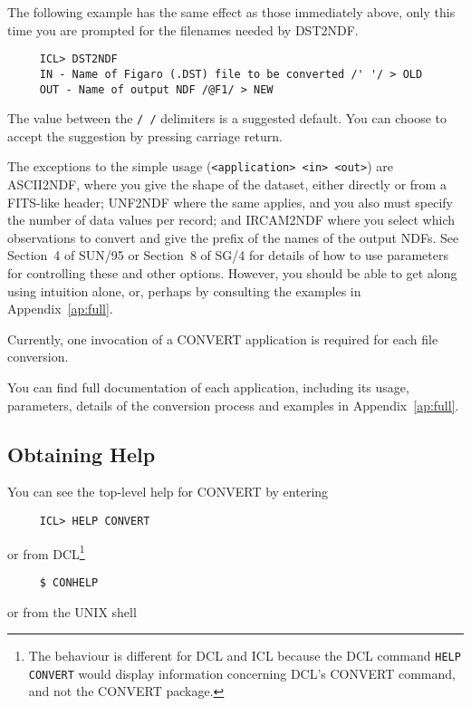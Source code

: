 The following example has the same effect as those immediately above,
only this time you are prompted for the filenames needed by DST2NDF. 

\small
\begin{verbatim}
     ICL> DST2NDF
     IN - Name of Figaro (.DST) file to be converted /' '/ > OLD
     OUT - Name of output NDF /@F1/ > NEW
\end{verbatim}
\normalsize
The value between the {\tt / /} delimiters is a suggested default.  You
can choose to accept the suggestion by pressing carriage return. 

The exceptions to the simple usage ({\tt <application> <in> <out>}) are
ASCII2NDF, where you give the shape of the dataset, either directly or
from a FITS-like header; UNF2NDF where the same applies, and you also
must specify the number of data values per record; and IRCAM2NDF where
you select which observations to convert and give the prefix of the
names of the output NDFs. See Section~4 of SUN/95 or Section~8 of SG/4
for details of how to use parameters for controlling these and other
options.  However, you should be able to get along using intuition
alone, or, perhaps by consulting the examples in Appendix~\ref{ap:full}.

Currently, one invocation of a {\footnotesize CONVERT} application is
required for each file conversion. 

You can find full documentation of each application, including its
usage, parameters, details of the conversion process and examples in
Appendix~\ref{ap:full}. 

\subsection{Obtaining Help}
You can see the top-level help for {\footnotesize CONVERT} by entering

\small
\begin{verbatim}
     ICL> HELP CONVERT
\end{verbatim}
\normalsize
or from {\footnotesize DCL}\footnote{The behaviour is different for DCL
and ICL because the DCL command {\tt HELP CONVERT} would display
information concerning DCL's CONVERT command, and not the CONVERT package.} 

\small
\begin{verbatim}
     $ CONHELP
\end{verbatim}
\normalsize
or from the UNIX shell 

